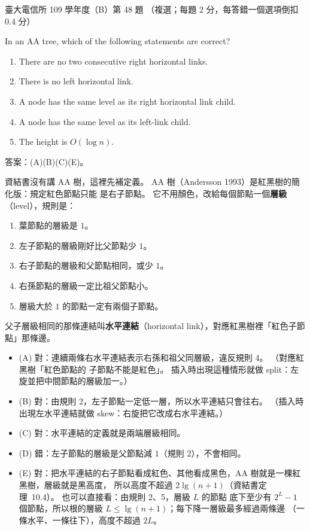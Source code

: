 \begin{pastexam}[label={px:ntu-109-comm-dsa-48}]{臺大電信所 109 學年度（B）第 48 題}
（複選；每題 2 分，每答錯一個選項倒扣 0.4 分）

In an AA tree, which of the following statements are correct?
\begin{enumerate}[label=(\Alph*),nosep]
\item There are no two consecutive right horizontal links.
\item There is no left horizontal link.
\item A node has the same level as its right horizontal link child.
\item A node has the same level as its left-link child.
\item The height is $O(\log n)$.
\end{enumerate}
\end{pastexam}

\begin{pastsoln}
答案：(A)(B)(C)(E)。

資結書沒有講 AA 樹，這裡先補定義。 AA 樹（Andersson 1993）是紅黑樹的簡化版：規定紅色節點只能
是右子節點。 它不用顏色，改給每個節點一個\textbf{層級}（level），規則是：
\begin{enumerate}
\item 葉節點的層級是 $1$。
\item 左子節點的層級剛好比父節點少 $1$。
\item 右子節點的層級和父節點相同，或少 $1$。
\item 右孫節點的層級一定比祖父節點小。
\item 層級大於 $1$ 的節點一定有兩個子節點。
\end{enumerate}
父子層級相同的那條連結叫\textbf{水平連結}（horizontal link），對應紅黑樹裡「紅色子節點」那條邊。

\begin{itemize}
\item (A) 對：連續兩條右水平連結表示右孫和祖父同層級，違反規則 4。 （對應紅黑樹「紅色節點的
子節點不能是紅色」。 插入時出現這種情形就做 split：左旋並把中間節點的層級加一。）
\item (B) 對：由規則 2，左子節點一定低一層，所以水平連結只會往右。 （插入時出現左水平連結就做
skew：右旋把它改成右水平連結。）
\item (C) 對：水平連結的定義就是兩端層級相同。
\item (D) 錯：左子節點的層級是父節點減 $1$（規則 2），不會相同。
\item (E) 對：把水平連結的右子節點看成紅色、其他看成黑色，AA 樹就是一棵紅黑樹，層級就是黑高度，
所以高度不超過 $2\lg(n + 1)$（資結書定理~10.4）。 也可以直接看：由規則 2、5，層級 $L$ 的節點
底下至少有 $2^L - 1$ 個節點，所以根的層級 $L \le \lg(n + 1)$；每下降一層級最多經過兩條邊
（一條水平、一條往下），高度不超過 $2L$。
\end{itemize}
\end{pastsoln}
